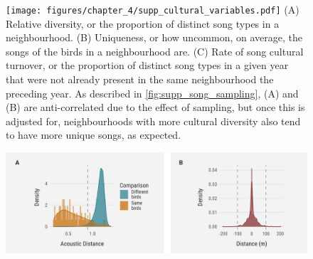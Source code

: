 \documentclass[9pt, onecolumn, twoside, lineno]{gsajnl}
\begin{document}
\begin{figure}[tbp]
    \centering
    \texttt{[image: figures/chapter\_4/supp\_cultural\_variables.pdf]}
    {
        (A) Relative diversity, or the proportion of distinct song types in a neighbourhood.
        (B) Uniqueness, or how uncommon, on average, the songs of the birds in a neighbourhood are.
        (C) Rate of song cultural turnover, or the proportion of distinct song types in a given year that were not already present in the same neighbourhood the preceding year.
        As described in \autoref{fig:supp_song_sampling}, (A) and (B) are anti-correlated due to the effect of sampling, but once this is adjusted for, neighbourhoods with more cultural diversity also tend to have more unique songs, as expected.
        }
    \label{fig:supp_cultural_variables}
\end{figure}

\begin{figure}[tbp]
    \centering
    \includegraphics[width=\linewidth]{figures/chapter_4/supp_acoustic_distance_threshold.pdf}
    \label{fig:supp_acoustic_distance_threshold}
\end{figure}
\end{document}
